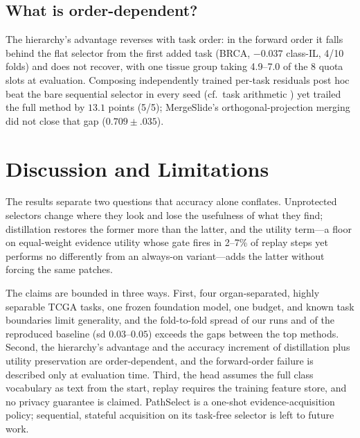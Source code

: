 \documentclass{article}
\begin{document}
\subsection{What is order-dependent?}
\label{ssec:order}

The hierarchy's advantage reverses with task order: in the forward order it falls behind the flat selector from the first added task (BRCA, $-0.037$ class-IL, 4/10 folds) and does not recover, with one tissue group taking 4.9--7.0 of the 8 quota slots at evaluation. Composing independently trained per-task residuals post hoc beat the bare sequential selector in every seed (cf.\ task arithmetic \cite{ilharco2023task}) yet trailed the full method by $13.1$ points (5/5); MergeSlide's orthogonal-projection merging \cite{bui2026mergeslide} did not close that gap ($0.709{\pm}.035$).

\FloatBarrier
\section{Discussion and Limitations}
\label{sec:discussion}

The results separate two questions that accuracy alone conflates. Unprotected selectors change where they look and lose the usefulness of what they find; distillation restores the former more than the latter, and the utility term---a floor on equal-weight evidence utility whose gate fires in 2--7\% of replay steps yet performs no differently from an always-on variant---adds the latter without forcing the same patches.

The claims are bounded in three ways. First, four organ-separated, highly separable TCGA tasks, one frozen foundation model, one budget, and known task boundaries limit generality, and the fold-to-fold spread of our runs and of the reproduced baseline (sd $0.03$--$0.05$) exceeds the gaps between the top methods. Second, the hierarchy's advantage and the accuracy increment of distillation plus utility preservation are order-dependent, and the forward-order failure is described only at evaluation time. Third, the head assumes the full class vocabulary as text from the start, replay requires the training feature store, and no privacy guarantee is claimed. PathSelect is a one-shot evidence-acquisition policy; sequential, stateful acquisition on its task-free selector is left to future work.

\end{document}
